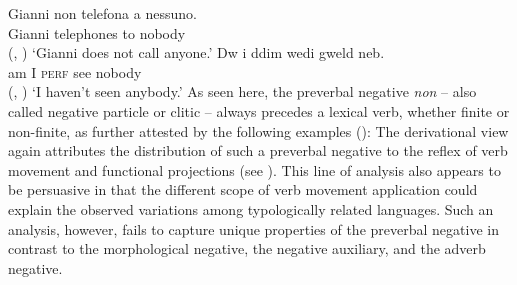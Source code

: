 \documentclass[output=paper
 	        ,biblatex
                ,babelshorthands
                ,newtxmath
                ,draftmode
                ,colorlinks, citecolor=brown
]{langscibook}
\begin{document}
\begin{exe}
\begin{xlist}
\eal
\ex \label{negation-position-1a}
\gll Gianni non telefona a nessuno.\\
     Gianni \NEG{} telephones to nobody\\ \hfill (, \citealt[]{Borsley:06})
\glt`Gianni does not call anyone.'
\ex \label{negation-position-1c}
\gll Dw i ddim wedi gweld neb.\\
     am I \NEG{} \textsc{perf} see nobody\\ \hfill  (, \citealt[]{Borsley:05})
\glt `I haven't seen anybody.'
\zl
%
%
As seen here,
the  preverbal negative \textit{non} -- also called negative particle or
clitic -- always precedes a lexical  verb, whether finite or
non-finite, as further attested by the following
examples (\citealp[Chapter~4]{Kim:00}):
%
\eal
{}
%
%
\zl
%
%
The derivational view again attributes the distribution of such
a preverbal negative to the reflex of verb movement and functional
projections (see \citealt[Chapter~1]{Belletti:90}). This line of analysis also appears to be persuasive
in that the different scope of verb movement application could explain
the observed variations among typologically related
languages. Such an analysis, however,
  fails to capture unique properties of the preverbal negative
  in contrast to the morphological negative, the negative auxiliary, and the adverb
  negative.


\end{xlist}
\end{exe}
\end{document}
